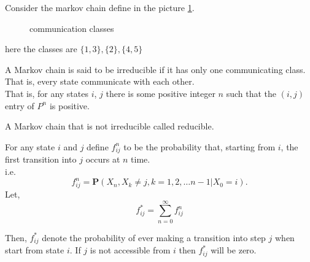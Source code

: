 \begin{example}[]
    Consider the markov chain define in the picture \cref{example of communication}.
\begin{figure}[h]
    \centering
    \caption{communication classes}
    \label{example of communication}
\end{figure}

here the classes are $\{ 1,3 \}, \{2\}, \{4,5\}$
\end{example}

\begin{definition}
    A Markov chain is said to be irreducible if it has only one communicating class. That is, every state communicate with each other.\\ 
    That is, for any states $i$, $j$ there is some positive integer $n$ such that the $(i, j)$ entry of $ P^{n} $ is positive.
\end{definition}

A Markov chain that is not irreducible called reducible.

For any state $ i $ and $ j $ define $ f^{n}_{ij} $ to be the probability that, starting from $ i $, the first transition into $ j  $
occurs at $ n $ time. \\ 
i.e. 
\[
    f^{n}_{ij} = \mathbf{P}(X_{n},X_{k}\neq j, k=1,2,\ldots n-1|X_{0}=i).
\]
Let,
\[
    f^*_{ij}=\sum_{n=0}^{\infty} f^{n}_{ij}
\]

Then, $ f^*_{ij} $ denote the probability of ever making a transition into step $ j $ when start from state $ i $. 
If $ j $ is not accessible from $ i $ then $ f^*_{ij} $ will be zero.

